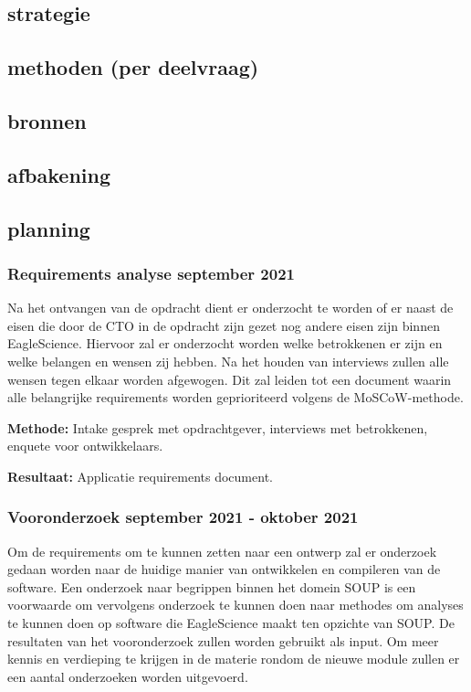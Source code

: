 \subsection{strategie}\label{subsec:strategie2}

\subsection{methoden (per deelvraag)}\label{subsec:methoden-(per-deelvraag)}
\subsection{bronnen}\label{subsec:bronnen}

\subsection{afbakening}\label{subsec:afbakening}

\subsection{planning}\label{subsec:planning}

\subsubsection{Requirements analyse \textbf{september 2021}}\label{sec:requirements-analyse}
Na het ontvangen van de opdracht dient er onderzocht te worden of er naast de eisen die door de CTO in de opdracht zijn gezet nog andere eisen zijn binnen EagleScience. Hiervoor zal er onderzocht worden welke betrokkenen er zijn en welke belangen en wensen zij hebben. Na het houden van interviews zullen alle wensen tegen elkaar worden afgewogen. Dit zal leiden tot een document waarin alle belangrijke requirements worden geprioriteerd volgens de MoSCoW-methode.

\textbf{Methode:} Intake gesprek met opdrachtgever, interviews met betrokkenen, enquete voor ontwikkelaars.

\textbf{Resultaat:} Applicatie requirements document.

\subsubsection{Vooronderzoek \textbf{september 2021 - oktober 2021 }}\label{sec:onderzoek}
Om de requirements om te kunnen zetten naar een ontwerp zal er onderzoek gedaan worden naar de huidige manier van ontwikkelen en compileren van de software. Een onderzoek naar begrippen binnen het domein SOUP is een voorwaarde om vervolgens onderzoek te kunnen doen naar methodes om analyses te kunnen doen op software die EagleScience maakt ten opzichte van SOUP. De resultaten van het vooronderzoek zullen worden gebruikt als input.
Om meer kennis en verdieping te krijgen in de materie rondom de nieuwe module zullen er een aantal onderzoeken worden uitgevoerd.


